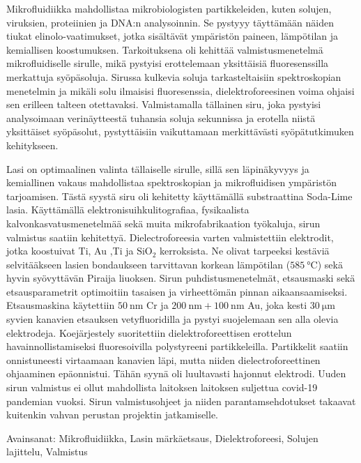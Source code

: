 \documentclass[final]{jyflluk}
\begin{document}
{
\noindent Mikrofluidiikka mahdollistaa mikrobiologisten partikkeleiden, kuten solujen, viruksien, proteiinien ja DNA:n analysoinnin. Se pystyyy täyttämään näiden tiukat elinolo-vaatimukset, jotka sisältävät ympäristön paineen, lämpötilan ja kemiallisen koostumuksen. Tarkoituksena oli kehittää valmistusmenetelmä mikrofluidiselle sirulle, mikä pystyisi erottelemaan yksittäisiä fluoresenssilla merkattuja syöpäsoluja. Sirussa kulkevia soluja tarkasteltaisiin spektroskopian menetelmin ja mikäli solu ilmaisisi fluoresenssia, dielektroforeesinen voima ohjaisi sen erilleen talteen otettavaksi. Valmistamalla tällainen siru, joka pystyisi analysoimaan verinäytteestä tuhansia soluja sekunnissa ja erotella niistä yksittäiset syöpäsolut, pystyttäisiin vaikuttamaan merkittävästi syöpätutkimuken kehitykseen. 

Lasi on optimaalinen valinta tällaiselle sirulle, sillä sen läpinäkyvyys ja kemiallinen vakaus mahdollistaa spektroskopian ja mikrofluidisen ympäristön tarjoamisen. Tästä syystä siru oli kehitetty käyttämällä substraattina Soda-Lime lasia. Käyttämällä elektronisuihkulitografiaa, fysikaalista kalvonkasvatusmenetelmää sekä muita mikrofabrikaation työkaluja, sirun valmistus saatiin kehitettyä. Dielectroforeesia varten valmistettiin elektrodit, jotka koostuivat Ti, Au ,Ti ja $\mathrm{SiO_2}$ kerroksista. Ne olivat tarpeeksi kestäviä selvitääkseen lasien bondaukseen tarvittavan korkean lämpötilan ($\SI{585}{\celsius}$) sekä hyvin syövyttävän Piraija liuoksen. Sirun puhdistusmenetelmät, etsausmaski sekä etsausparametrit optimoitiin tasaisen ja virheettömän pinnan aikaansaamiseksi. Etsausmaskina käytettiin $\SI{50}{\nano \metre}$ Cr ja $\SI{200}{\nano \metre} + \SI{100}{\nano \metre}$ Au, joka kesti $\SI{30}{\micro \metre}$ syvien kanavien etsauksen vetyfluoridilla ja pystyi suojelemaan sen alla olevia elektrodeja. Koejärjestely suoritettiin dielektroforeettisen erottelun havainnollistamiseksi fluoresoivilla polystyreeni partikkeleilla. Partikkelit saatiin onnistuneesti virtaamaan kanavien läpi, mutta niiden dielectroforeettinen ohjaaminen epäonnistui. Tähän syynä oli luultavasti hajonnut elektrodi. Uuden sirun valmistus ei ollut mahdollista laitoksen laitoksen suljettua covid-19 pandemian vuoksi. Sirun valmistusohjeet ja niiden parantamsehdotukset takaavat kuitenkin vahvan perustan projektin jatkamiselle. 

}

\bigskip 

\noindent Avainsanat: Mikrofluidiikka, Lasin märkäetsaus, Dielektroforeesi, Solujen lajittelu, Valmistus
\end{document}
